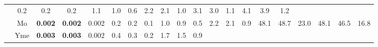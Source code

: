 \documentclass[french,10pt]{article}
\begin{document}
\begin{landscape}
\begin{longtable}{ l c | c c c | c c c | c c c | c c c | c c c | c c c | }
    & 0.2
    & {\footnotesize                         0.2
    } & {\footnotesize                         0.2
    }


    & 1.1
    & {\footnotesize                         1.0
    } & {\footnotesize                         0.6
    }


    & 2.2
    & {\footnotesize                         2.1
    } & {\footnotesize                         1.0
    }


    & 3.1
    & {\footnotesize                         3.0
    } & {\footnotesize                         1.1
    }


    & 4.1
    & {\footnotesize                         3.9
    } & {\footnotesize                         1.2
    }
    
    
                    \\*
                        & {\small Mo  }

    &                                         \textbf{ 0.002}
    & {\footnotesize                         \textbf{ 0.002}
    } & {\footnotesize                         0.002
    }


    & 0.2
    & {\footnotesize                         0.2
    } & {\footnotesize                         0.1
    }


    & 1.0
    & {\footnotesize                         0.9
    } & {\footnotesize                         0.5
    }


    & 2.2
    & {\footnotesize                         2.1
    } & {\footnotesize                         0.9
    }


    & 48.1
    & {\footnotesize                         48.7
    } & {\footnotesize                         23.0
    }


    & 48.1
    & {\footnotesize                         46.5
    } & {\footnotesize                         16.8
    }
    
    
                    \\*
    & {\small Yme  }

    &                                         \textbf{ 0.003}
    & {\footnotesize                         \textbf{ 0.003}
    } & {\footnotesize                         0.002
    }


    & 0.4
    & {\footnotesize                         0.3
    } & {\footnotesize                         0.2
    }


    & 1.7
    & {\footnotesize                         1.5
    } & {\footnotesize                         0.9
    }



\end{longtable}
\end{landscape}
\end{document}
